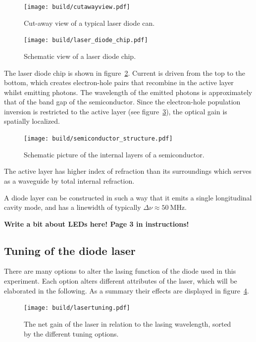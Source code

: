 \begin{figure}[ht]
  \centering
  \texttt{[image: build/cutawayview.pdf]}
  \caption{Cut-away view of a typical laser diode can\cite{anleitung}.}%
  \label{fig:cutawayview}
\end{figure}

\begin{figure}[ht]
  \centering
  \texttt{[image: build/laser\_diode\_chip.pdf]}
  \caption{Schematic view of a laser diode chip\cite{anleitung}.}%
  \label{fig:laser_diode_chip}
\end{figure}

The laser diode chip is shown in figure~\ref{fig:laser_diode_chip}.
Current is driven from the top to the bottom, which creates electron-hole pairs that
recombine in the active layer whilst emitting photons.
The wavelength of the emitted photons is approximately that of the band gap of the semiconductor.
Since the electron-hole population inversion is restricted to the active layer (see
figure~\ref{fig:semiconductor_structure}),
the optical gain is spatially localized.

\begin{figure}[ht]
  \centering
  \texttt{[image: build/semiconductor\_structure.pdf]}
  \caption{Schematic picture of the internal layers of a semiconductor\cite{anleitung}.}%
  \label{fig:semiconductor_structure}
\end{figure}

The active layer has higher index of refraction than its surroundings
which serves as a waveguide by total internal refraction.

A diode layer can be constructed in such a way that it emits a single longitudinal cavity mode,
and has a linewidth of typically $\Delta \nu \approx \SI{50}{\mega\hertz}$.

\textbf{Write a bit about LEDs here! Page 3 in instructions!}

\subsection{Tuning of the diode laser}\label{tuning-of-the-diode-laser}
There are many options to alter the lasing function of the diode used in this experiment.
Each option alters different attributes of the laser, which will be elaborated in the following.
As a summary their effects are displayed in figure~\ref{fig:lasertuning}.
\begin{figure}[ht]
  \centering
  \texttt{[image: build/lasertuning.pdf]}
  \caption{The net gain of the laser in relation to the lasing wavelength, sorted by the different
  tuning options\cite{anleitung}.}%
  \label{fig:lasertuning}
\end{figure}

